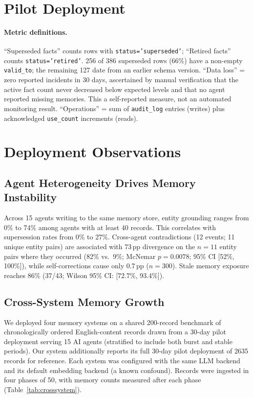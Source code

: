 \documentclass{llncs}
\begin{document}
\section{Pilot Deployment}


\paragraph{Metric definitions.}
``Superseded facts'' counts rows with \texttt{status='superseded'}; ``Retired facts'' counts \texttt{status='retired'}. 256 of 386 superseded rows (66\%) have a non-empty \texttt{valid\_to}; the remaining 127 date from an earlier schema version. ``Data loss'' = zero reported incidents in 30 days, ascertained by manual verification that the active fact count never decreased below expected levels and that no agent reported missing memories. This a self-reported measure, not an automated monitoring result. ``Operations'' = sum of \texttt{audit\_log} entries (writes) plus acknowledged \texttt{use\_count} increments (reads).

\section{Deployment Observations}


\subsection{Agent Heterogeneity Drives Memory Instability}

Across 15 agents writing to the same memory store, entity grounding ranges from 0\% to 74\% among agents with at least 40 records. This correlates with supersession rates from 0\% to 27\%. Cross-agent contradictions (12 events; 11 unique entity pairs) are associated with 73\,pp divergence on the $n{=}11$ entity pairs where they occurred (82\% vs.\ 9\%; McNemar $p{=}0.0078$; 95\% CI [52\%, 100\%]), while self-corrections cause only 0.7\,pp ($n{=}300$).  Stale memory exposure reaches 86\% (37/43; Wilson 95\% CI: [72.7\%, 93.4\%]).

\subsection{Cross-System Memory Growth}

We deployed four memory systems on a shared 200-record benchmark of chronologically ordered English-content records drawn from a 30-day pilot deployment serving 15 AI agents (stratified to include both burst and stable periods). Our system additionally reports its full 30-day pilot deployment of 2{}635 records for reference. Each system was configured with the same LLM backend and its default embedding backend (a known confound). Records were ingested in four phases of 50, with memory counts measured after each phase (Table~\ref{tab:crosssystem}).
\end{document}
